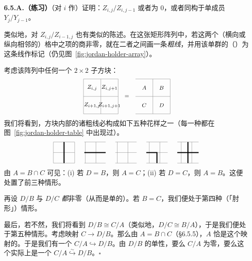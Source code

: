 \textbf{6.5.A.（练习）}\quad （对 $i$ 作\trDescendingInduction{}）证明：$Z_{i,j}/Z_{i,j-1}$ 或者为 $0$，或者同构于单成员 $Y_j/Y_{j-1}$。

类似地，对 $Z_{i,j}/Z_{i-1,j}$ 也有类似的陈述。在这张矩形阵列中，若这两个（横向或纵向相邻的）格中之项的商非零，就在二者之间画一条\emph{粗线}，并用该单群的（\trIsomorphismClass{}）为这条线作标记（仍见图~\ref{fig:jordan-holder-array}）。

考虑该阵列中任何一个 $2\times 2$ 子方块：
\[
\begin{tikzpicture}[baseline={(current bounding box.center)},every node/.style={font=\footnotesize}]
  \draw[black!50] (0,0) grid[step=0.9] (1.8,1.8);
  \node at (0.45,1.35) {$Z_{i,j}$};
  \node at (1.35,1.35) {$Z_{i,j+1}$};
  \node at (0.45,0.45) {$Z_{i+1,j}$};
  \node at (1.35,0.45) {$Z_{i+1,j+1}$};
  \node at (2.25,0.9) {$=$};
  \draw[black!50] (2.7,0) grid[step=0.9] (4.5,1.8);
  \node at (3.15,1.35) {$A$};
  \node at (4.05,1.35) {$B$};
  \node at (3.15,0.45) {$C$};
  \node at (4.05,0.45) {$D$};
\end{tikzpicture}
\]
我们将看到，方块内部的诸粗线必构成如下五种花样之一（每一种都在图~\ref{fig:jordan-holder-table} 中出现过）。
\[
\begin{tikzpicture}[baseline={(current bounding box.center)},every node/.style={font=\footnotesize}]
  \draw[black!50] (0,0) grid[step=0.55] (1.1,1.1);
  \draw[line width=1.5pt] (0.55,0) -- (0.55,1.1);
  \draw[black!50] (1.6,0) grid[step=0.55] (2.7,1.1);
  \draw[line width=1.5pt] (1.6,0.55) -- (2.7,0.55);
  \draw[black!50] (3.2,0) grid[step=0.55] (4.3,1.1);
  \draw[black!50] (4.8,0) grid[step=0.55] (5.9,1.1);
  \draw[line width=1.5pt] (4.8,0.55) -- (5.35,0.55) -- (5.35,0);
  \draw[black!50] (6.4,0) grid[step=0.55] (7.5,1.1);
  \draw[line width=1.5pt] (6.95,0) -- (6.95,1.1) (6.4,0.55) -- (7.5,0.55);
\end{tikzpicture}
\]
由 $A=B\cap C$ 可见：(i) 若 $D=B$，则 $A=C$；(ii) 若 $D=C$，则 $A=B$。这便处置了前三种情形。

再设 $D/B$ 与 $D/C$ \emph{都}非零（从而是单的）。若 $B=C$，我们便处于第四种（「肘形」）情形。

最后，若不然，我们将看到 $D/B\cong C/A$（类似地，$D/C\cong B/A$），于是我们便处于第五种情形。考虑映射 $C\to D/B$。那么由 $A=B\cap C$（\S6.5.5），$A$ 恰是这个映射的\trKernel。于是我们有一个\trMonomorphism{} $C/A\hookrightarrow D/B$。由 $D/B$ 的单性，要么 $C/A$ 为零，要么这个\trMonomorphism{}实际上是一个\trIsomorphism{} $C/A\overset{\sim}{\hookrightarrow}D/B$。\hfill$\square$

